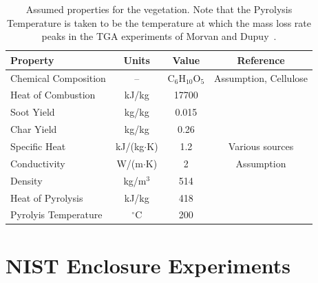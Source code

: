 \begin{table}
\begin{center}
\caption[Assumed properties for the vegetation]{Assumed properties for the vegetation. Note that the Pyrolysis Temperature is taken to be the temperature at which the mass loss rate peaks in the TGA experiments of Morvan and Dupuy~\cite{Morvan:CF2004}.}
\label{Assumed_Properties_Trees}
\begin{tabular}{|l|c|c|c|}
\hline
Property                        & Units                 & Value                     & Reference                             \\ \hline \hline
Chemical Composition            & --                    & C$_6$H$_{10}$O$_5$        & Assumption, Cellulose                 \\ \hline
Heat of Combustion              & kJ/kg                 & 17700                     & \cite{Susott:FS1982}                  \\ \hline
Soot Yield                      & kg/kg                 & 0.015                     & \cite{SFPE:Tewarson}                  \\ \hline
Char Yield                      & kg/kg                 & 0.26                      & \cite{Susott:FS1982}                  \\ \hline
Specific Heat                   & kJ/(kg$\cdot$K)       & 1.2                       & Various sources                       \\ \hline
Conductivity                    & W/(m$\cdot$K)         & 2                         & Assumption                            \\ \hline
Density                         & kg/m$^3$              & 514                       & \cite{Rothermel:1972}                 \\ \hline
Heat of Pyrolysis               & kJ/kg                 & 418                       & \cite{Morvan:CF2004}                  \\ \hline
Pyrolyis Temperature            & $^\circ$C             & 200                       & \cite{Morvan:CF2004}                  \\ \hline
\end{tabular}
\end{center}
\end{table}


\section{NIST Enclosure Experiments}
\label{NIST_Enclosure_Description}

